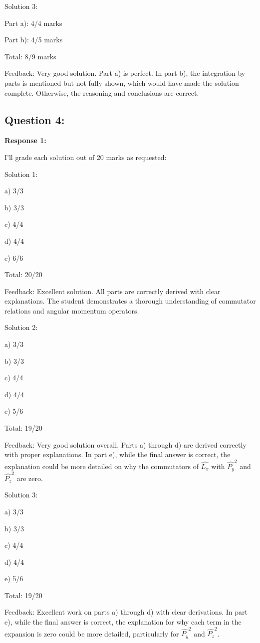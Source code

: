\documentclass[a4paper,11pt]{article}
\begin{document}
Solution 3:

Part a): 4/4 marks

Part b): 4/5 marks

Total: 8/9 marks

Feedback: Very good solution. Part a) is perfect. In part b), the integration by parts is mentioned but not fully shown, which would have made the solution complete. Otherwise, the reasoning and conclusions are correct.


\subsection*{Question 4:}

\textbf{Response 1:}

I'll grade each solution out of 20 marks as requested:

Solution 1:

a) 3/3

b) 3/3

c) 4/4

d) 4/4

e) 6/6

Total: 20/20

Feedback: Excellent solution. All parts are correctly derived with clear explanations. The student demonstrates a thorough understanding of commutator relations and angular momentum operators.

Solution 2:

a) 3/3

b) 3/3

c) 4/4

d) 4/4

e) 5/6

Total: 19/20

Feedback: Very good solution overall. Parts a) through d) are derived correctly with proper explanations. In part e), while the final answer is correct, the explanation could be more detailed on why the commutators of \( \hat{L_{x}} \) with \( \hat{P_{y}}^2 \) and \( \hat{P_{z}}^2 \) are zero.

Solution 3:

a) 3/3

b) 3/3

c) 4/4

d) 4/4

e) 5/6

Total: 19/20

Feedback: Excellent work on parts a) through d) with clear derivations. In part e), while the final answer is correct, the explanation for why each term in the expansion is zero could be more detailed, particularly for \( \hat{P_{y}}^2 \) and \( \hat{P_{z}}^2 \).
\end{document}
